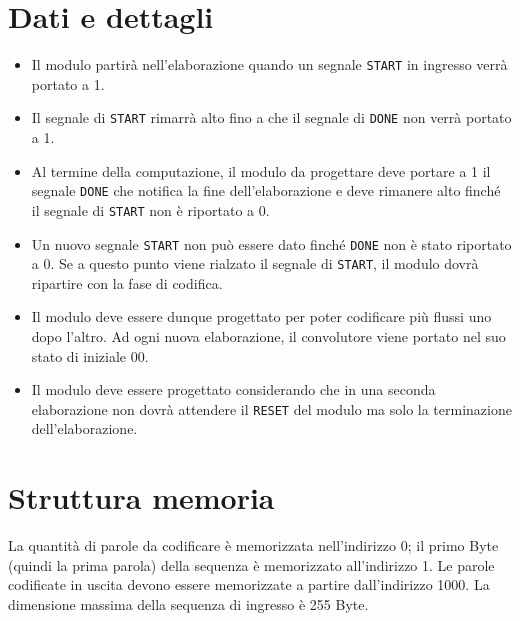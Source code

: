 \section{Dati e dettagli}
\begin{itemize}
    \item Il modulo partirà nell'elaborazione quando un segnale \texttt{START} in ingresso verrà portato a 1.
    \item Il segnale di \texttt{START} rimarrà alto fino a che il segnale di \texttt{DONE} non verrà portato a 1.
    \item Al termine della computazione, il modulo da progettare deve portare a 1 il segnale \texttt{DONE} che notifica la fine dell’elaborazione e deve rimanere alto finché il segnale di \texttt{START} non è riportato a 0. 
    \item Un nuovo segnale \texttt{START} non può essere dato finché \texttt{DONE} non è stato riportato a 0. Se a questo punto viene rialzato il segnale di \texttt{START}, il modulo dovrà ripartire con la fase di codifica.
    \item Il modulo deve essere dunque progettato per poter codificare più flussi uno dopo l’altro. Ad ogni nuova elaborazione, il convolutore viene portato nel suo stato di iniziale 00.
    \item Il modulo deve essere progettato considerando che in una seconda elaborazione non dovrà attendere il \texttt{RESET} del modulo ma solo la terminazione dell'elaborazione.
\end{itemize}

\section{Struttura memoria}
La quantità di parole da codificare è memorizzata nell’indirizzo 0; il primo Byte (quindi la prima parola) della sequenza è memorizzato all’indirizzo 1. Le parole codificate in uscita devono essere memorizzate a partire dall’indirizzo 1000. La dimensione massima della sequenza di ingresso è 255 Byte.

